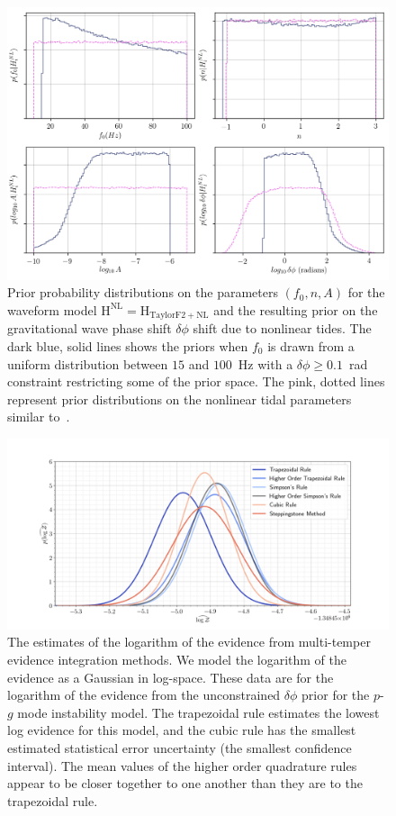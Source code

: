 \begin{figure}
\centering
\includegraphics[width=1.0\textwidth]{figs/chapter6/all_pg_priors}
\caption{Prior probability distributions on the parameters $(f_0, n, A)$ for the waveform model $\mathrm{H}^{\mathrm{NL}} = \mathrm{H}_\mathrm{TaylorF2+NL}$ and the resulting prior on the gravitational wave phase shift $\delta\phi$ shift due to nonlinear tides. The dark blue, solid lines shows the priors when $f_0$ is drawn from a uniform distribution between $15$ and $100$~Hz with a $\delta\phi \ge 0.1$~rad constraint restricting some of the prior space. The pink, dotted lines represent prior distributions on the nonlinear tidal parameters similar to~\cite{abbott2019constraining}.}
\label{fig:priors}
\end{figure}

\begin{figure}
\centering
\includegraphics[width=1.0\textwidth]{figs/chapter6/multi_temper_log_z_lsc_sim.png}
\caption{The estimates of the logarithm of the evidence from multi-temper evidence integration methods. We model the logarithm of the evidence as a Gaussian in log-space. These data are for the logarithm of the evidence from the unconstrained $\delta \phi$ prior for the $p$-$g$ mode instability model. The trapezoidal rule estimates the lowest log evidence for this model, and the cubic rule has the smallest estimated statistical error uncertainty (the smallest confidence interval). The mean values of the higher order quadrature rules appear to be closer together to one another than they are to the trapezoidal rule.}
\label{fig:lvc_sim_log_evidence_distr}
\end{figure}

